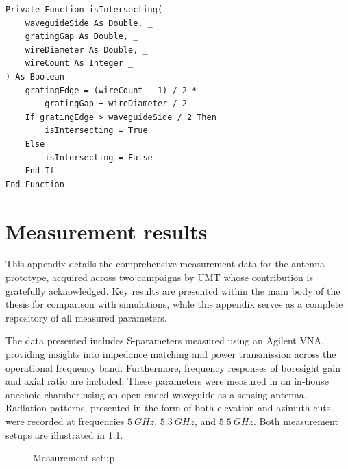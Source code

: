 \documentclass[11pt,a4paper,twoside,openany]{report}
\newlength{\twosubht}
\begin{document}
\begin{lstlisting}[caption={Check for intersection with waveguide walls}, label={lst:is-intersecting}, language=VBScript]
Private Function isIntersecting( _
    waveguideSide As Double, _
    gratingGap As Double, _
    wireDiameter As Double, _
    wireCount As Integer _
) As Boolean
    gratingEdge = (wireCount - 1) / 2 * _
        gratingGap + wireDiameter / 2
    If gratingEdge > waveguideSide / 2 Then
        isIntersecting = True
    Else
        isIntersecting = False
    End If
End Function
\end{lstlisting}

\chapter{Measurement results}
\label{appendix:measurement-results}
This appendix details the comprehensive measurement data for the antenna prototype, acquired across two campaigns by UMT whose contribution is gratefully acknowledged. Key results are presented within the main body of the thesis for comparison with simulations, while this appendix serves as a complete repository of all measured parameters.

The data presented includes S-parameters measured using an Agilent VNA, providing insights into impedance matching and power transmission across the operational frequency band. Furthermore, frequency responses of boresight gain and axial ratio are included. These parameters were measured in an in-house anechoic chamber using an open-ended waveguide as a sensing antenna. Radiation patterns, presented in the form of both elevation and azimuth cuts, were recorded at frequencies $\qty{5}{GHz}$, $\qty{5.3}{GHz}$, and $\qty{5.5}{GHz}$. Both measurement setups are illustrated in \cref{fig:measurement-setup}.

\begin{figure}[!ht]
    \sbox{}
    \setlength{\twosubht}{\ht\twosubbox}

    \centering
    \quad
    \caption{\label{fig:measurement-setup}Measurement setup}
\end{figure}
\end{document}
